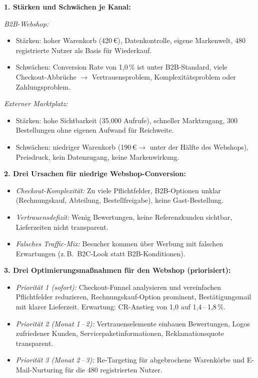 \documentclass[11pt,a4paper,oneside]{article}
\begin{document}
\begin{loesungbox}
\textbf{1. Stärken und Schwächen je Kanal:}

\smallskip
\emph{B2B-Webshop:}
\begin{itemize}
  \item Stärken: hoher Warenkorb (420\,\euro), Datenkontrolle, eigene Markenwelt, 480 registrierte Nutzer als Basis für Wiederkauf.
  \item Schwächen: Conversion Rate von 1,0\,\% ist unter B2B-Standard, viele Checkout-Abbrüche $\rightarrow$ Vertrauensproblem, Komplexitätsproblem oder Zahlungsproblem.
\end{itemize}

\emph{Externer Marktplatz:}
\begin{itemize}
  \item Stärken: hohe Sichtbarkeit (35.000 Aufrufe), schneller Marktzugang, 300 Bestellungen ohne eigenen Aufwand für Reichweite.
  \item Schwächen: niedriger Warenkorb (190\,\euro $\rightarrow$ unter der Hälfte des Webshops), Preisdruck, kein Datenzugang, keine Markenwirkung.
\end{itemize}

\textbf{2. Drei Ursachen für niedrige Webshop-Conversion:}
\begin{itemize}
  \item \emph{Checkout-Komplexität:} Zu viele Pflichtfelder, B2B-Optionen unklar (Rechnungskauf, Abteilung, Bestellfreigabe), keine Gast-Bestellung.
  \item \emph{Vertrauensdefizit:} Wenig Bewertungen, keine Referenzkunden sichtbar, Lieferzeiten nicht transparent.
  \item \emph{Falsches Traffic-Mix:} Besucher kommen über Werbung mit falschen Erwartungen (z.\,B.\ B2C-Look statt B2B-Konditionen).
\end{itemize}

\textbf{3. Drei Optimierungsmaßnahmen für den Webshop (priorisiert):}
\begin{itemize}
  \item \emph{Priorität 1 (sofort):} Checkout-Funnel analysieren und vereinfachen \textendash{} Pflichtfelder reduzieren, Rechnungskauf-Option prominent, Bestätigungsmail mit klarer Lieferzeit. Erwartung: CR-Anstieg von 1,0 auf 1,4\,--\,1,8\,\%.
  \item \emph{Priorität 2 (Monat 1\,--\,2):} Vertrauenselemente einbauen \textendash{} Bewertungen, Logos zufriedener Kunden, Servicepaketinformationen, Reklamationsquote transparent.
  \item \emph{Priorität 3 (Monat 2\,--\,3):} Re-Targeting für abgebrochene Warenkörbe und E-Mail-Nurturing für die 480 registrierten Nutzer.
\end{itemize}


\end{loesungbox}
\end{document}
